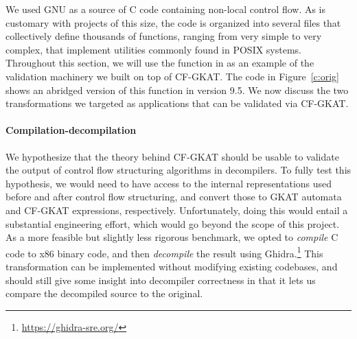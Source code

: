 
We used GNU  as a source of C code containing non-local control flow.
%
As is customary with projects of this size, the code is organized into several files that collectively define thousands of functions, ranging from very simple to very complex, that implement utilities commonly found in POSIX systems.
%
Throughout this section, we will use the function  in  as an example of the validation machinery we built on top of CF-GKAT. The code in Figure~\ref{c:orig} shows an abridged version of this function in  version 9.5. We now discuss the two transformations we targeted as applications that can be validated via CF-GKAT.

\paragraph{Compilation-decompilation}
We hypothesize that the theory behind CF-GKAT should be usable to validate the output of control flow structuring algorithms in decompilers.
To fully test this hypothesis, we would need to have access to the internal representations used before and after control flow structuring, and convert those to GKAT automata and CF-GKAT expressions, respectively.
Unfortunately, doing this would entail a substantial engineering effort, which would go beyond the scope of this project.
As a more feasible but slightly less rigorous benchmark, we opted to \emph{compile} C code to x86 binary code, and then \emph{decompile} the result using Ghidra.\footnote{\url{https://ghidra-sre.org/}}
This transformation can be implemented without modifying existing codebases, and should still give some insight into decompiler correctness in that it lets us compare the decompiled source to the original.

